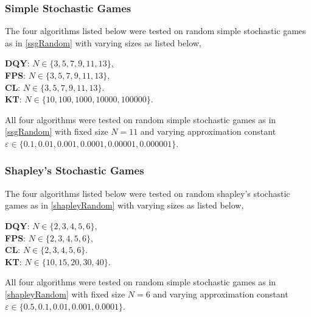 \subsubsection{Simple Stochastic Games}
\begin{test} \label{ssgMainTest}
  The four algorithms listed below were tested on random simple stochastic
  games as in \cref{ssgRandom} with varying sizes as listed below,
  \begin{itemize}
      \textbf{DQY}: $N \in \{3, 5, 7, 9, 11, 13\}$, \\
      \textbf{FPS}: $N \in \{3, 5, 7, 9, 11, 13\}$, \\
      \textbf{CL}: $N \in \{3, 5, 7, 9, 11, 13\}$. \\
      \textbf{KT}: $N \in \{10, 100, 1000, 10000, 100000\}$.
  \end{itemize}
\end{test}
\begin{test} \label{ssgApproxTest}
  All four algorithms were tested on random simple stochastic
  games as in \cref{ssgRandom} with fixed size $N = 11$ and varying
  approximation constant $\varepsilon \in \{ 0.1, 0.01, 0.001, 0.0001, 0.00001, 0.000001 \}$.
\end{test}

\subsubsection{Shapley's Stochastic Games}
\begin{test} \label{shapleyMainTest}
  The four algorithms listed below were tested on random shapley's stochastic
  games as in \cref{shapleyRandom} with varying sizes as listed below,
  \begin{itemize}
      \textbf{DQY}: $N \in \{2, 3, 4, 5, 6\}$, \\
      \textbf{FPS}: $N \in \{2, 3, 4, 5, 6\}$, \\
      \textbf{CL}: $N \in \{2, 3, 4, 5, 6\}$. \\
      \textbf{KT}: $N \in \{10, 15, 20, 30, 40\}$.
  \end{itemize}
\end{test}

\begin{test} \label{shapleyApproxTest}
  All four algorithms were tested on random simple stochastic
  games as in \cref{shapleyRandom} with fixed size $N = 6$ and varying
  approximation constant $\varepsilon \in \{ 0.5, 0.1, 0.01, 0.001, 0.0001 \}$.
\end{test}
